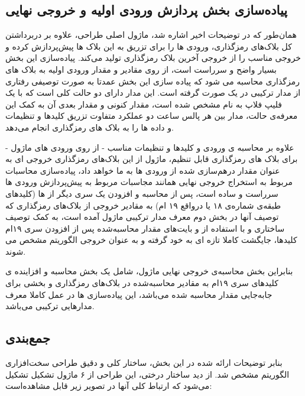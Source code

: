 \subsection{
پیاده‌سازی بخش پردازش ورودی اولیه و خروجی نهایی
}
همان‌طور که در توضیحات اخیر اشاره شد، ماژول اصلی طراحی،
علاوه بر دربرداشتن کل بلاک‌های رمزگذاری، ورودی ها را برای تزریق به این بلاک ها پیش‌پردازش کرده و خروجی مناسب را از خروجی آخرین بلاک رمزگذاری تولید می‌کند. پیاده‌سازی این بخش بسیار واضح و سرراست است، از روی مقادیر 
و 
مقدار ورودی اولیه به بلاک های رمزگذاری محاسبه می شود که پیاده سازی این بخش عمدتا به صورت توصیفی رفتاری از مدار ترکیبی در یک 
صورت گرفته است. این 
مدار 
دارای دو حالت کلی است که با یک فلیپ فلاپ به نام
مشخص شده است، مقدار کنونی
 و مقدار بعدی آن 
 به کمک این معرفه‌ی حالت، مدار بین هر پالس ساعت دو عملکرد متفاوت تزریق کلید‌ها و تنظیمات و داده ها را به بلاک های رمزگذاری انجام می‌دهد.
 
 علاوه بر محاسبه ی ورودی و کلید‌ها و تنظیمات مناسب - از روی ورودی های ماژول - برای بلاک های رمزگذاری قابل تنظیم، ماژول 
  از این بلاک‌‌های رمزگذاری خروجی ای به عنوان مقدار درهم‌سازی شده از ورودی ها به ما خواهد داد، پیاده‌سازی محاسبات مربوط به استخراج خروجی نهایی همانند مجاسبات مربوط به پیش‌پردازش ورودی ها سر‌راست و ساده است، پس از محاسبه و افزودن یک سری دیگر از 
  ها (کلید‌های طبقه‌ی شماره‌ی ۱۸ یا درواقع ۱۹ ام) به مقادیر خروجی از بلاک‌های رمزگذاری که توصیف آنها در بخش دوم
  معرف مدار ترکیبی ماژول آمده است،
 به کمک توصیف ساختاری و با استفاده از
  و 
  بایت‌های مقدار محاسبه‌شده پس از افزودن سری ۱۹ام کلید‌ها، جایگشت کاملا تازه ای به خود گرفته و به عنوان خروجی الگوریتم مشخص می شوند.
  
  بنابراین بخش محاسبه‌ی خروجی نهایی ماژول، شامل یک بخش محاسبه و افزاینده ی کلید‌های سری ۱۹ام به مقادیر محاسبه‌شده در بلاک‌های رمزگذاری و بخشی برای جابه‌جایی مقدار محاسبه شده می‌باشد، این پیاده‌سازی ها در عمل کاملا معرف مدار‌هایی ترکیبی می‌باشد.
  
  \subsection{ 
جمع‌بندی
  }
بنابر توضیحات ارائه شده در این بخش، ساختار کلی و دقیق طراحی سخت‌افزاری الگوریتم مشخص شد. از دید ساختار درختی، این طراحی  از ۶ ماژول تشکیل تشکیل می‌شود که ارتباط کلی آنها در تصویر زیر قابل مشاهده‌است:

